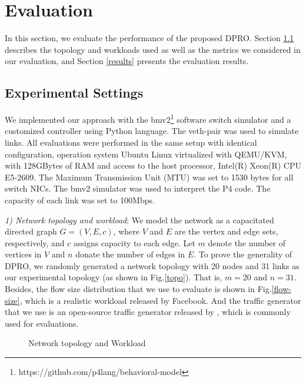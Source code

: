 \documentclass[10pt,conference]{IEEEtran}
\begin{document}
\section{Evaluation}
In this section, we evaluate the performance of the proposed DPRO. Section \ref{setting} describes the topology and workloads used as well as the metrics we considered in our evaluation, and Section \ref{results} presents the evaluation results.
\subsection{Experimental Settings}\label{setting}
We implemented our approach with the bmv2\footnote{https://github.com/p4lang/behavioral-model} software switch simulator and a customized controller using Python language. The veth-pair was used to simulate links. All evaluations were performed in the same setup with identical configuration, operation system Ubuntu Linux virtualized with QEMU/KVM, with 128GBytes of RAM and access to the host processor, Intel(R) Xeon(R) CPU E5-2609. The Maximum Transmission Unit (MTU) was set to 1530 bytes for all switch NICs. The bmv2 simulator was used to interpret the P4 code. The capacity of each link was set to 100Mbps.

\emph{1) Network topology and workload}: We model the network as a capacitated directed graph $G=(V, E,c)$, where $V$ and $E$ are the vertex and edge sets, respectively, and $c$ assigns capacity to each edge. Let $m$ denote the number of vertices in $V$ and $n$ donate the number of edges in $E$. To prove the generality of DPRO, we randomly generated a network topology with 20 nodes and 31 links as our experimental topology (as shown in Fig.\ref{topo}). That is, $m=20$ and $n=31$. Besides, the flow size distribution that we use to evaluate is shown in Fig.\ref{flow-size}, which is a realistic workload released by Facebook. And the traffic generator that we use is an open-source traffic generator released by \cite{Li2016ClickNP}, which is commonly used for evaluations.

\begin{figure}[t]
\centering
{}
\caption{Network topology and Workload}
\label{topo-and-workload}
\end{figure}
\end{document}
